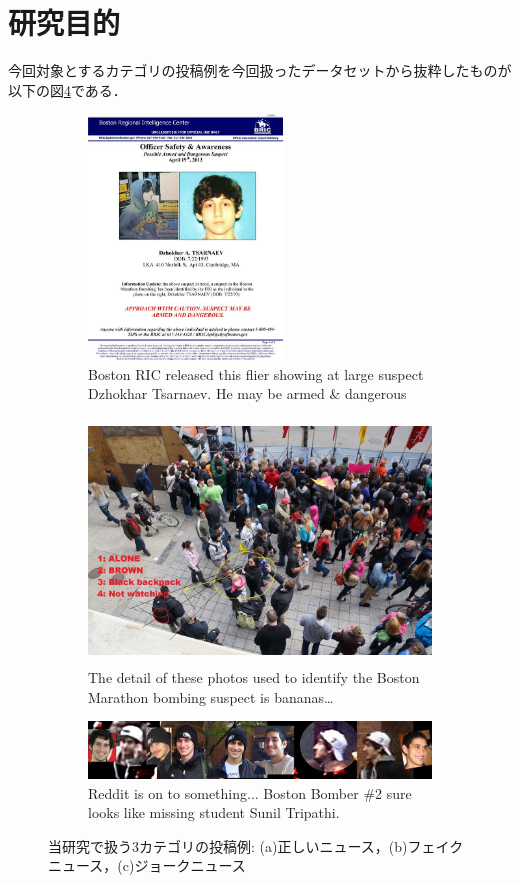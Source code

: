 \section{研究目的}
\label{ch:purpose}
%
今回対象とするカテゴリの投稿例を今回扱ったデータセットから抜粋したものが以下の図\ref{fig:examples}である．

\begin{figure}[ht]
    \centering
    \begin{subfigure}[b]{0.4\textwidth}
        \includegraphics[height=6.5cm]{images/real_example_boston.jpg}
        \caption{Boston RIC released this flier showing at large suspect Dzhokhar Tsarnaev. He may be armed \& dangerous}
        \label{fig:real}
    \end{subfigure}
    \hfill %
    \begin{subfigure}[b]{0.57\textwidth}
        \includegraphics[height=6.5cm]{images/humor_example_boston.jpg}
        \caption{The detail of these photos used to identify the Boston Marathon bombing suspect is bananas…}
        \label{fig:humor}
    \end{subfigure}
    \bigskip 
    \centering
    \begin{subfigure}[b]{\textwidth}
        \includegraphics[width=\textwidth]{images/fake_example_boston.jpg}
        \caption{Reddit is on to something... Boston Bomber \#2 sure looks like missing student Sunil Tripathi. }
        \label{fig:fake}
    \end{subfigure}
    \caption{当研究で扱う3カテゴリの投稿例: (a)正しいニュース，(b)フェイクニュース，(c)ジョークニュース}
    \label{fig:examples}
\end{figure}

